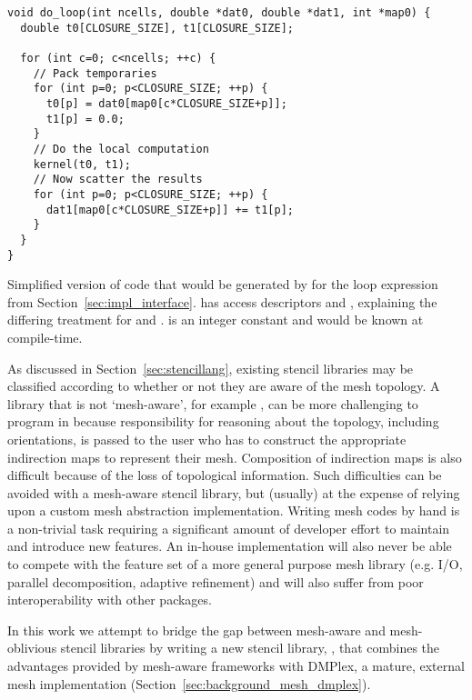\begin{listing}
  \begin{verbatim}
void do_loop(int ncells, double *dat0, double *dat1, int *map0) {
  double t0[CLOSURE_SIZE], t1[CLOSURE_SIZE];

  for (int c=0; c<ncells; ++c) {
    // Pack temporaries
    for (int p=0; p<CLOSURE_SIZE; ++p) {
      t0[p] = dat0[map0[c*CLOSURE_SIZE+p]];
      t1[p] = 0.0;
    }
    // Do the local computation
    kernel(t0, t1);
    // Now scatter the results
    for (int p=0; p<CLOSURE_SIZE; ++p) {
      dat1[map0[c*CLOSURE_SIZE+p]] += t1[p];
    }
  }
}
  \end{verbatim}
  \caption{
    Simplified version of code that would be generated by  for the loop expression from Section~\ref{sec:impl_interface}.
     has access descriptors  and , explaining the differing treatment for  and .
     is an integer constant and would be known at compile-time.
  }
  \label{lst:basicloop}
\end{listing}

As discussed in Section~\ref{sec:stencillang}, existing stencil libraries may be classified according to whether or not they are aware of the mesh topology.
A library that is not `mesh-aware', for example , can be more challenging to program in because responsibility for reasoning about the topology, including orientations, is passed to the user who has to construct the appropriate indirection maps to represent their mesh.
Composition of indirection maps is also difficult because of the loss of topological information.
Such difficulties can be avoided with a mesh-aware stencil library, but (usually) at the expense of relying upon a custom mesh abstraction implementation.
Writing mesh codes by hand is a non-trivial task requiring a significant amount of developer effort to maintain and introduce new features.
An in-house implementation will also never be able to compete with the feature set of a more general purpose mesh library (e.g. I/O, parallel decomposition, adaptive refinement) and will also suffer from poor interoperability with other packages.

In this work we attempt to bridge the gap between mesh-aware and mesh-oblivious stencil libraries by writing a new stencil library, , that combines the advantages provided by mesh-aware frameworks with DMPlex, a mature, external mesh implementation (Section~\ref{sec:background_mesh_dmplex}).

